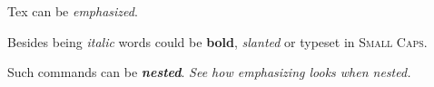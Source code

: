 \documentclass{article}
\begin{document}
	Tex can be \emph{emphasized}.
	
	Besides being \textit{italic} words could be \textbf{bold}, \textsl{slanted} or typeset in \textsc{Small Caps}.
	
	Such commands can be \textit{\textbf{nested}}.
	\emph{See how \emph{emphasizing} looks when nested.}
\end{document}
